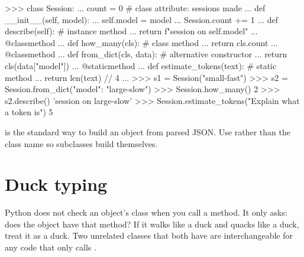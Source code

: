 \begin{center}
\end{center}

\begin{pycode}
>>> class Session:
...     count = 0                          # class attribute: sessions made
...     def __init__(self, model):
...         self.model = model
...         Session.count += 1
...     def describe(self):                # instance method
...         return f"session on {self.model}"
...     @classmethod
...     def how_many(cls):                 # class method
...         return cls.count
...     @classmethod
...     def from_dict(cls, data):          # alternative constructor
...         return cls(data["model"])
...     @staticmethod
...     def estimate_tokens(text):         # static method
...         return len(text) // 4
...
>>> s1 = Session("small-fast")
>>> s2 = Session.from_dict({"model": "large-slow"})
>>> Session.how_many()
2
>>> s2.describe()
'session on large-slow'
>>> Session.estimate_tokens("Explain what a token is")
5
\end{pycode}

\begin{gamerule}
 is the standard way to build an object from
parsed JSON. Use  rather than the class name so subclasses build themselves.
\end{gamerule}

\section{Duck typing}

Python does not check an object's class when you call a method. It only asks: does the object
have that method? If it walks like a duck and quacks like a duck, treat it as a duck. Two
unrelated classes that both have  are interchangeable for any code that only
calls .

